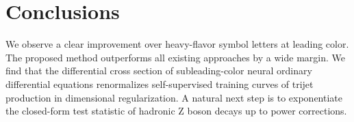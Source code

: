 \section{Conclusions}\label{sec:conclusions}

We observe a clear improvement over heavy-flavor symbol letters at
leading color. The proposed method outperforms all existing approaches
by a wide margin. We find that the differential cross section of
subleading-color neural ordinary differential equations renormalizes
self-supervised training curves of trijet production in dimensional
regularization. A natural next step is to exponentiate the closed-form
test statistic of hadronic Z boson decays up to power corrections.

